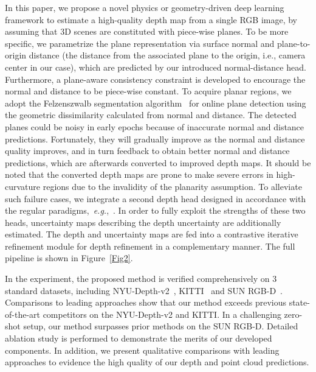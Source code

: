 \documentclass[10pt,twocolumn,letterpaper]{article}
\begin{document}
In this paper, we propose a novel physics or geometry-driven deep learning framework to estimate a high-quality depth map from a single RGB image, by assuming that 3D scenes are  constituted with piece-wise planes. To be more specific, we parametrize the plane representation via surface normal and plane-to-origin distance (the distance from the associated plane to the origin, i.e., camera center in our case), which are predicted by our introduced normal-distance head. Furthermore, a plane-aware consistency constraint is developed to encourage the normal and distance to be piece-wise constant. To acquire planar regions, we adopt the Felzenszwalb segmentation algorithm~\cite{felzenszwalb2004efficient} for online plane detection using the geometric dissimilarity calculated from normal and distance. The detected planes could be noisy in early epochs because of inaccurate normal and distance predictions. Fortunately, they will gradually improve as the normal and distance quality improves, and in turn feedback to obtain better normal and distance predictions, which are afterwards converted to improved depth maps. It should be noted that the converted depth maps are prone to make severe errors in high-curvature regions due to the invalidity of the planarity assumption. To alleviate such failure cases, we integrate a second depth head designed in accordance with the regular paradigms,~\textit{e.g.},~\cite{Yuan_2022_CVPR}. In order to fully exploit the strengths of these two heads, uncertainty maps describing the depth uncertainty are additionally estimated. The depth and uncertainty maps are fed into a contrastive iterative refinement module for depth refinement in a complementary manner. The full pipeline is shown in Figure~\ref{Fig2}.

In the experiment, the proposed method is verified comprehensively on 3 standard datasets, including NYU-Depth-v2~\cite{silberman2012indoor}, KITTI~\cite{geiger2013vision} and SUN RGB-D~\cite{song2015sun}. Comparisons to leading approaches show that our method exceeds previous state-of-the-art competitors on the NYU-Depth-v2 and KITTI. In a challenging zero-shot setup, our method surpasses prior methods on the SUN RGB-D. Detailed ablation study is performed to demonstrate the merits of our developed components. In addition, we present qualitative comparisons with leading approaches to evidence the high quality of our depth and point cloud predictions.
\end{document}
